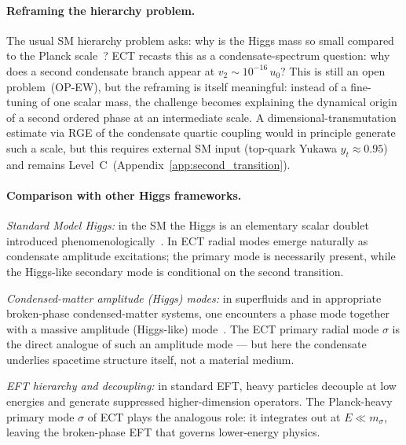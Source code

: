 \documentclass[11pt,a4paper]{article}
\numberwithin{equation}{section}
\begin{document}
\paragraph{Reframing the hierarchy problem.}
The usual SM hierarchy problem asks: why is the Higgs mass so small compared
to the Planck scale~\cite{tHooft1979}?
ECT recasts this as a condensate-spectrum question: why does a second
condensate branch appear at $v_2\sim 10^{-16}\,u_0$?
This is still an open problem~(OP-EW), but the reframing is itself meaningful:
instead of a fine-tuning of one scalar mass, the challenge becomes explaining
the dynamical origin of a second ordered phase at an intermediate scale.
A dimensional-transmutation estimate via RGE of the condensate quartic coupling
would in principle generate such a scale, but this requires external SM input
(top-quark Yukawa $y_t\approx0.95$) and remains Level~C~(Appendix~\ref{app:second_transition}).

\paragraph{Comparison with other Higgs frameworks.}

\emph{Standard Model Higgs:}
in the SM the Higgs is an elementary scalar doublet introduced
phenomenologically~\cite{EnglertBrout1964,Higgs1964}.
In ECT radial modes emerge naturally as condensate amplitude excitations;
the primary mode is necessarily present, while the Higgs-like secondary
mode is conditional on the second transition.

\emph{Condensed-matter amplitude (Higgs) modes:}
in superfluids and in appropriate broken-phase condensed-matter systems,
one encounters a phase mode together with a massive amplitude
(Higgs-like) mode~\cite{LittlewoodVarma1981,Volovik2003}.
The ECT primary radial mode $\sigma$ is the direct analogue of such an
amplitude mode --- but here the condensate underlies spacetime structure itself,
not a material medium.

\emph{EFT hierarchy and decoupling:}
in standard EFT, heavy particles decouple at low energies and generate
suppressed higher-dimension operators.
The Planck-heavy primary mode $\sigma$ of ECT plays the analogous role:
it integrates out at $E\ll m_\sigma$, leaving the broken-phase EFT
that governs lower-energy physics.
\end{document}
